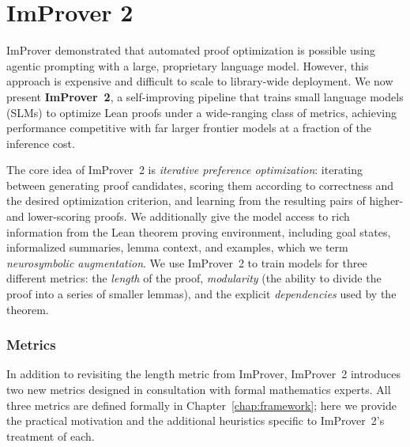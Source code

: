 \newcommand{\Unassigned}{\text{Unassigned}}
\newcommand{\dom}{\text{dom}}
\newcommand{\inst}{\text{inst}}
\newcommand{\Children}{\text{Children}}
\newcommand{\Step}{\text{Step}}
\newcommand{\goalbefore}{\text{goalsbefore}}
\newcommand{\goalsafter}{\text{goalsafter}}
\newcommand{\Deps}{\text{Deps}}
\newcommand{\Current}{\text{Current}}
\newcommand{\Spawned}{\text{Spawned}}
\newcommand{\prodmap}{\text{prodmap}}

\chapter{ImProver 2}\label{chap:improver2}

ImProver demonstrated that automated proof optimization is possible using agentic prompting with a large, proprietary language model. However, this approach is expensive and difficult to scale to library-wide deployment. We now present \textbf{ImProver~2}, a self-improving pipeline that trains small language models (SLMs) to optimize Lean proofs under a wide-ranging class of metrics, achieving performance competitive with far larger frontier models at a fraction of the inference cost.

The core idea of ImProver~2 is \textit{iterative preference optimization}: iterating between generating proof candidates, scoring them according to correctness and the desired optimization criterion, and learning from the resulting pairs of higher- and lower-scoring proofs. We additionally give the model access to rich information from the Lean theorem proving environment, including goal states, informalized summaries, lemma context, and examples, which we term \textit{neurosymbolic augmentation}. We use ImProver~2 to train models for three different metrics: the \textit{length} of the proof, \textit{modularity} (the ability to divide the proof into a series of smaller lemmas), and the explicit \textit{dependencies} used by the theorem.

\subsection{Metrics}
\label{sec:improver2_metrics}

In addition to revisiting the length metric from ImProver, ImProver~2 introduces two new metrics designed in consultation with formal mathematics experts. All three metrics are defined formally in Chapter~\ref{chap:framework}; here we provide the practical motivation and the additional heuristics specific to ImProver~2's treatment of each.

